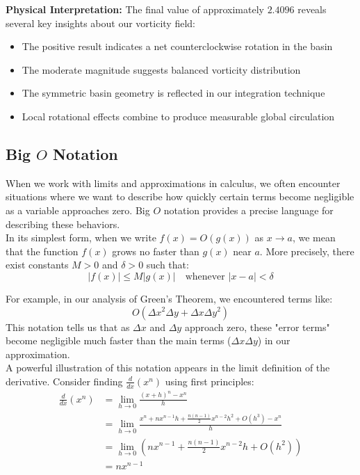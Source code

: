 \begin{example}
\begin{solution}
\noindent \textbf{Physical Interpretation:}
The final value of approximately $2.4096$ reveals several key insights about our vorticity field:
\begin{itemize}
   \item The positive result indicates a net counterclockwise rotation in the basin
   \item The moderate magnitude suggests balanced vorticity distribution
   \item The symmetric basin geometry is reflected in our integration technique
   \item Local rotational effects combine to produce measurable global circulation
\end{itemize}

\end{solution}
\end{example}
\exampleline


\subsection*{Big $O$ Notation}

\noindent When we work with limits and approximations in calculus, we often encounter situations where we want to describe how quickly certain terms become negligible as a variable approaches zero. Big $O$ notation provides a precise language for describing these behaviors. \\

\noindent In its simplest form, when we write $f(x) = O(g(x))$ as $x \to a$, we mean that the function $f(x)$ grows no faster than $g(x)$ near $a$. More precisely, there exist constants $M > 0$ and $\delta > 0$ such that:
\[
|f(x)| \leq M|g(x)| \quad \text{whenever } |x-a| < \delta
\]

\noindent For example, in our analysis of Green's Theorem, we encountered terms like:
\[
O(\Delta x^2\Delta y + \Delta x\Delta y^2)
\]
This notation tells us that as $\Delta x$ and $\Delta y$ approach zero, these "error terms" become negligible much faster than the main terms ($\Delta x\Delta y$) in our approximation. \\

\noindent A powerful illustration of this notation appears in the limit definition of the derivative. Consider finding $\frac{d}{dx}(x^n)$ using first principles:
\begin{align*}
\frac{d}{dx}(x^n) &= \lim_{h \to 0} \frac{(x+h)^n - x^n}{h} \\
&= \lim_{h \to 0} \frac{x^n + nx^{n-1}h + \frac{n(n-1)}{2}x^{n-2}h^2 + O(h^3) - x^n}{h} \\
&= \lim_{h \to 0} \left(nx^{n-1} + \frac{n(n-1)}{2}x^{n-2}h + O(h^2)\right) \\
&= nx^{n-1}
\end{align*}

